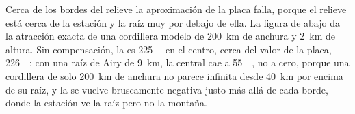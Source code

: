Cerca de los bordes del relieve la aproximación de la placa falla, porque el relieve está cerca de la estación y la raíz muy por
debajo de ella. La figura de abajo da la atracción exacta de una cordillera modelo de \qty{200}{km} de anchura y \qty{2}{km} de
altura. Sin compensación, la  es \qty{+225}{\milli\gal} en el centro, cerca del valor de la placa,
\qty{226}{\milli\gal}; con una raíz de Airy de \qty{9}{km}, la  central cae a \qty{+55}{\milli\gal}, no a cero,
porque una cordillera de solo \qty{200}{km} de anchura no parece infinita desde \qty{40}{km} por encima de su raíz, y la  se vuelve bruscamente negativa justo más allá de cada borde, donde la estación ve la raíz pero no la montaña.

